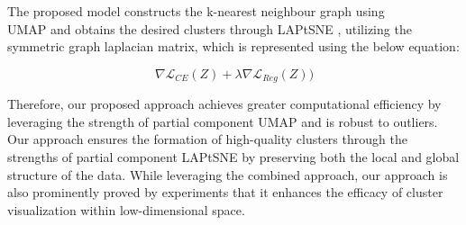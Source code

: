The proposed model constructs the k-nearest neighbour graph using \\UMAP \cite{umap_reference} and obtains the desired clusters through LAPtSNE \cite{sun2023laplacian}, utilizing the symmetric graph laplacian matrix, which is represented using the below equation:

\begin{equation}
    \nabla \mathcal{L}_{CE}(Z) + \lambda \nabla \mathcal{L}_{Reg}(Z))
\end{equation}


Therefore, our proposed approach achieves greater computational efficiency by leveraging the strength of partial component UMAP \cite{umap_reference} and is robust to outliers. Our approach ensures the formation of high-quality clusters through the strengths of partial component LAPtSNE \cite{sun2023laplacian} by preserving both the local and global structure of the data. While leveraging the combined approach, our approach is also prominently proved by experiments that it enhances the efficacy of cluster visualization within low-dimensional space.



